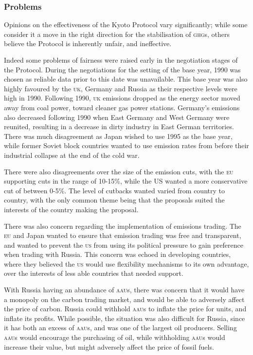 \subsubsection{Problems}

Opinions on the effectiveness of the Kyoto Protocol vary significantly; while some consider it a move in the right direction for the stabilisation of \textsc{ghg}s, others believe the Protocol is inherently unfair, and ineffective.

Indeed some problems of fairness were raised early in the negotiation stages of the Protocol. During the negotiations for the setting of the base year, 1990 was chosen as reliable data prior to this date was unavailable. This base year was also highly favoured by the \textsc{uk}, Germany and Russia as their respective \CO levels were high in 1990. Following 1990, \textsc{uk} emissions dropped as the energy sector moved away from coal power, toward cleaner gas power stations. Germany's \CO emissions also decreased following 1990 when East Germany and West Germany were reunited, resulting in a decrease in dirty industry in East German territories. There was much disagreement as Japan wished to use 1995 as the base year, while former Soviet block countries wanted to use emission rates from before their industrial collapse at the end of the cold war.

There were also disagreements over the size of the emission cuts, with the \textsc{eu} supporting cuts in the range of 10-15\%, while the US wanted a more conservative cut of between 0-5\%. The level of cutbacks wanted varied from country to country, with the only common theme being that the proposals suited the interests of the country making the proposal.~\cite{Grubb-economics}

There was also concern regarding the implementation of emissions trading. The \textsc{eu} and Japan wanted to ensure that emission trading was free and transparent, and wanted to prevent the \textsc{us} from using its political pressure to gain preference when trading with Russia. This concern was echoed in developing countries, where they believed the \textsc{us} would use flexibility mechanisms to its own advantage, over the interests of less able countries that needed support.

With Russia having an abundance of \textsc{aau}s, there was concern that it would have a monopoly on the carbon trading market, and would be able to adversely affect the price of carbon. Russia could withhold \textsc{aau}s to inflate the price for units, and inflate its profits. While possible, the situation was also difficult for Russia, since it has both an excess of \textsc{aau}s, and was one of the largest oil producers. Selling \textsc{aau}s would encourage the purchasing of oil, while withholding \textsc{aau}s would increase their value, but might adversely affect the price of fossil fuels.

